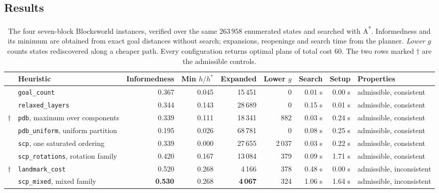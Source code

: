 \documentclass[10pt,twocolumn,a4paper]{article}
\theoremstyle{plain}
\theoremstyle{definition}
\theoremstyle{remark}
\newcommand{\hstar}{h^{*}}
\newcommand{\code}[1]{\texttt{#1}}
\begin{document}
\subsection{Results}

\begin{table}[t]
\centering
\caption{The four seven-block Blocksworld instances, verified over the same
$263\,958$ enumerated states and searched with A\textsuperscript{*}.
Informedness and its minimum are obtained from exact goal distances without
search; expansions, reopenings and search time from the planner. \emph{Lower
$g$} counts states rediscovered along a cheaper path. Every configuration
returns optimal plans of total cost $60$. The two rows marked $\dagger$ are the
admissible controls.}
\label{tab:comparison}
\small
\begin{adjustbox}{max width=\textwidth}
\begin{tabular}{llrrrrrrl}
\toprule
& Heuristic & Informedness & Min $h/\hstar$ & Expanded & Lower $g$ & Search & Setup & Properties \\
\midrule
& \code{goal\_count}      & 0.367 & 0.045 & 15\,451 & 0      & 0.01 s & 0.00 s & admissible, consistent \\
& \code{relaxed\_layers}  & 0.344 & 0.143 & 28\,689 & 0      & 0.15 s & 0.01 s & admissible, consistent \\
\midrule
$\dagger$ & \code{pdb}, maximum over components & 0.339 & 0.111 & 18\,341 & 882    & 0.03 s & 0.24 s & admissible, consistent \\
& \code{pdb\_uniform}, uniform partition        & 0.195 & 0.026 & 68\,781 & 0      & 0.08 s & 0.25 s & admissible, consistent \\
& \code{scp}, one saturated ordering            & 0.339 & 0.000 & 27\,655 & 2\,037 & 0.03 s & 0.22 s & admissible, consistent \\
& \code{scp\_rotations}, rotation family        & 0.420 & 0.167 & 13\,084 & 379    & 0.09 s & 1.71 s & admissible, consistent \\
\midrule
$\dagger$ & \code{landmark\_cost}                & 0.520 & 0.268 & 4\,166  & 378    & 0.48 s & 0.00 s & admissible, inconsistent \\
& \code{scp\_mixed}, mixed family               & \textbf{0.530} & 0.268 & \textbf{4\,067} & 324 & 1.06 s & 1.64 s & admissible, inconsistent \\
\bottomrule
\end{tabular}
\end{adjustbox}
\end{table}
\end{document}
